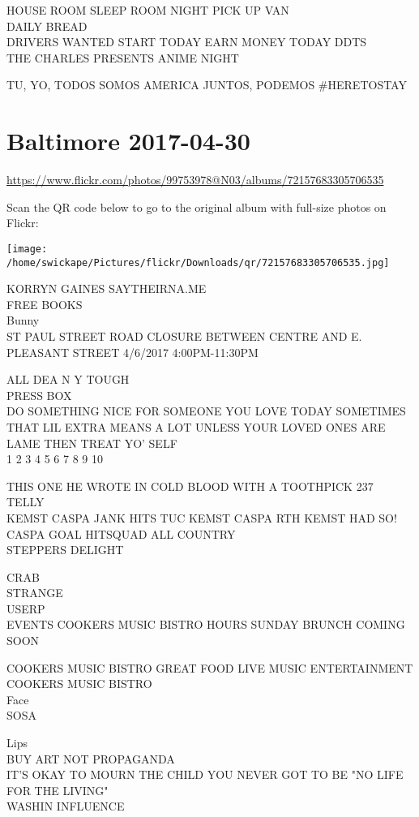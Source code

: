 \documentclass[10pt,letterpaper]{article}
\begin{document}
HOUSE ROOM SLEEP ROOM NIGHT PICK UP VAN\\
DAILY BREAD\\
DRIVERS WANTED START TODAY EARN MONEY TODAY DDTS\\
THE CHARLES PRESENTS ANIME NIGHT

TU, YO, TODOS SOMOS AMERICA JUNTOS, PODEMOS \#HERETOSTAY


\section*{Baltimore 2017-04-30}

\url{https://www.flickr.com/photos/99753978@N03/albums/72157683305706535}

Scan the QR code below to go to the original album with full-size photos on Flickr:

\texttt{[image: /home/swickape/Pictures/flickr/Downloads/qr/72157683305706535.jpg]}


KORRYN GAINES SAYTHEIRNA.ME\\
FREE BOOKS\\
Bunny\\
ST PAUL STREET ROAD CLOSURE BETWEEN CENTRE AND E. PLEASANT STREET 4/6/2017 4:00PM{-}11:30PM

ALL DEA N Y TOUGH\\
PRESS BOX\\
DO SOMETHING NICE FOR SOMEONE YOU LOVE TODAY SOMETIMES THAT LIL EXTRA MEANS A LOT UNLESS YOUR LOVED ONES ARE LAME THEN TREAT YO' SELF\\
1 2 3 4 5 6 7 8 9 10

THIS ONE HE WROTE IN COLD BLOOD WITH A TOOTHPICK 237\\
TELLY\\
KEMST CASPA JANK HITS TUC KEMST CASPA RTH KEMST HAD SO!  CASPA GOAL HITSQUAD ALL COUNTRY\\
STEPPERS DELIGHT

CRAB\\
STRANGE\\
USERP\\
EVENTS COOKERS MUSIC BISTRO HOURS SUNDAY BRUNCH COMING SOON

COOKERS MUSIC BISTRO GREAT FOOD LIVE MUSIC ENTERTAINMENT\\
COOKERS MUSIC BISTRO\\
Face\\
SOSA

Lips\\
BUY ART NOT PROPAGANDA\\
IT'S OKAY TO MOURN THE CHILD YOU NEVER GOT TO BE "NO LIFE FOR THE LIVING"\\
WASHIN INFLUENCE
\end{document}
